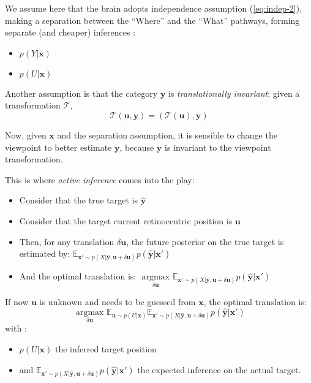 We assume here that the brain adopts independence assumption (\ref{eq:indep-2}), making a separation between the ``Where'' and the ``What'' pathways, forming separate (and cheaper) inferences :
\begin{itemize}
\item $p(Y|\boldsymbol{x})$
\item $p(U|\boldsymbol{x})$
\end{itemize}

Another assumption is that the category $\boldsymbol{y}$ is \emph{translationally invariant}: given a transformation $\mathcal{T}$,
$$\mathcal{T}(\boldsymbol{u}, \boldsymbol{y}) 
= (\mathcal{T}(\boldsymbol{u}), \boldsymbol{y})$$

Now, given $\boldsymbol{x}$ and the separation assumption, it is sensible to change the viewpoint to better estimate $\boldsymbol{y}$, because  $\boldsymbol{y}$ is invariant to the viewpoint transformation.

This is where \emph{active inference} comes into the play:
\begin{itemize}
\item Consider that the true target is $\hat{\boldsymbol{y}}$
\item Consider that the target current retinocentric position is $\boldsymbol{u}$
\item Then, for any translation $\delta \boldsymbol{u}$, the future posterior on the true target is estimated by:
$\mathbb{E}_{\boldsymbol{x}'\sim p(X|\hat{\boldsymbol{y}}, \boldsymbol{u}+\delta \boldsymbol{u})} p(\hat{\boldsymbol{y}}|\boldsymbol{x}')$
\item And the optimal translation is:  $\underset{\delta\boldsymbol{u}}{\text{ argmax }}  \mathbb{E}_{\boldsymbol{x}'\sim p(X|\hat{\boldsymbol{y}}, \boldsymbol{u}+\delta \boldsymbol{u})} p(\hat{\boldsymbol{y}}|\boldsymbol{x}')$
\end{itemize}

If now $\boldsymbol{u}$ is unknown and needs to be guessed from $\boldsymbol{x}$, the optimal translation is:
$$\underset{\delta\boldsymbol{u}}{\text{ argmax }} \mathbb{E}_{\boldsymbol{u}\sim p(U|\boldsymbol{x})} \mathbb{E}_{\boldsymbol{x}'\sim p(X|\hat{\boldsymbol{y}}, \boldsymbol{u}+\delta \boldsymbol{u})} p(\hat{\boldsymbol{y}}|\boldsymbol{x}')$$
with :
\begin{itemize}
\item $p(U|\boldsymbol{x})$ the inferred target position
\item and $\mathbb{E}_{\boldsymbol{x}'\sim p(X|\hat{\boldsymbol{y}}, \boldsymbol{u}+\delta \boldsymbol{u})} p(\hat{\boldsymbol{y}}|\boldsymbol{x}')$ the expected inference on the actual target.
\end{itemize}

